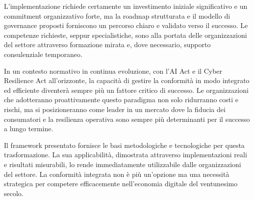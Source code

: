 L'implementazione richiede certamente un investimento iniziale significativo e un commitment organizzativo forte, ma la roadmap strutturata e il modello di governance proposti forniscono un percorso chiaro e validato verso il successo. Le competenze richieste, seppur specialistiche, sono alla portata delle organizzazioni del settore attraverso formazione mirata e, dove necessario, supporto consulenziale temporaneo.

In un contesto normativo in continua evoluzione, con l'AI Act e il Cyber Resilience Act all'orizzonte, la capacità di gestire la conformità in modo integrato ed efficiente diventerà sempre più un fattore critico di successo. Le organizzazioni che adotteranno proattivamente questo paradigma non solo ridurranno costi e rischi, ma si posizioneranno come leader in un mercato dove la fiducia dei consumatori e la resilienza operativa sono sempre più determinanti per il successo a lungo termine.

Il framework presentato fornisce le basi metodologiche e tecnologiche per questa trasformazione. La sua applicabilità, dimostrata attraverso implementazioni reali e risultati misurabili, lo rende immediatamente utilizzabile dalle organizzazioni del settore. La conformità integrata non è più un'opzione ma una necessità strategica per competere efficacemente nell'economia digitale del ventunesimo secolo.

\clearpage
\printbibliography[
    heading=subbibliography,
    title={Riferimenti Bibliografici del Capitolo 4},
    segment=\therefsegment
]
